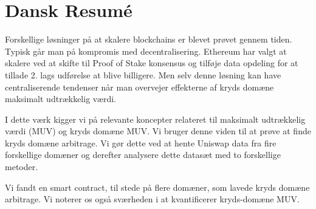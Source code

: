 \section*{Dansk Resumé}
Forskellige løsninger på at skalere blockchains er blevet prøvet gennem tiden. Typisk går man på kompromis med decentralisering. Ethereum har valgt at skalere ved at skifte til Proof of Stake konsensus og tilføje data opdeling for at tillade 2. lags udførelse at blive billigere. Men selv denne løsning kan have centraliserende tendenser når man overvejer effekterne af kryds domæne maksimalt udtrækkelig værdi.

I dette værk kigger vi på relevante koncepter relateret til maksimalt udtrækkelig værdi (MUV) og kryds domæne MUV. Vi bruger denne viden til at prøve at finde kryds domæne arbitrage. Vi gør dette ved at hente Uniswap data fra fire forskellige domæner og derefter analysere dette datasæt med to forskellige metoder.

Vi fandt en smart contract, til stede på flere domæner, som lavede kryds domæne arbitrage. Vi noterer os også sværheden i at kvantificerer kryds-domæne MUV.

